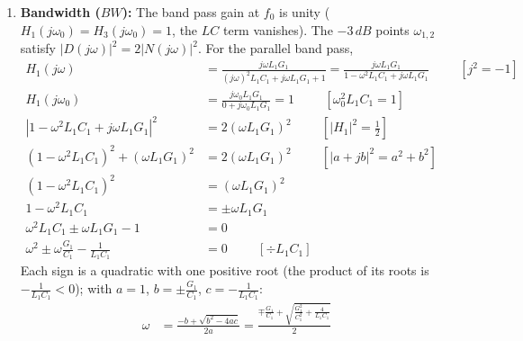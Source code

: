 \begin{enumerate}
\begin{enumerate}
        Zero DC gain for \(H_3(s)\). \\
        For band stop \(H_4(s)\):
        \begin{align*}
          H_4(0) &= \frac{G_1(1 + 0^2 \cdot L_1 C_1)}{0 \cdot C_1 + G_1(1 + 0^2 \cdot L_1 C_1)} = \frac{G_1(1 + 0)}{0 + G_1(1 + 0)} = \frac{G_1}{G_1} = 1
        \end{align*}
        Unity DC gain for \(H_4(s)\).
    \end{enumerate}
  \item \textbf{Bandwidth (\(BW\)):}
    The band pass gain at \(f_0\) is unity (\(H_1(j\omega_0) = H_3(j\omega_0) = 1\),
    the \(LC\) term vanishes). The \(-3\,dB\) points \(\omega_{1,2}\) satisfy
    \(|D(j\omega)|^2 = 2|N(j\omega)|^2\). For the parallel band pass,
    \begin{align*}
      H_1(j\omega) &= \frac{j\omega L_1 G_1}{(j\omega)^2 L_1 C_1 + j\omega L_1 G_1 + 1} = \frac{j\omega L_1 G_1}{1 - \omega^2 L_1 C_1 + j\omega L_1 G_1} \hspace{1cm} [j^2 = -1] \\
      H_1(j\omega_0) &= \frac{j\omega_0 L_1 G_1}{0 + j\omega_0 L_1 G_1} = 1 \hspace{1cm} [\omega_0^2 L_1 C_1 = 1] \\
      \left|1 - \omega^2 L_1 C_1 + j\omega L_1 G_1\right|^2 &= 2 (\omega L_1 G_1)^2 \hspace{1cm} [|H_1|^2 = \tfrac{1}{2}] \\
      (1 - \omega^2 L_1 C_1)^2 + (\omega L_1 G_1)^2 &= 2 (\omega L_1 G_1)^2 \hspace{1cm} [|a + jb|^2 = a^2 + b^2] \\
      (1 - \omega^2 L_1 C_1)^2 &= (\omega L_1 G_1)^2 \\
      1 - \omega^2 L_1 C_1 &= \pm \omega L_1 G_1 \\
      \omega^2 L_1 C_1 \pm \omega L_1 G_1 - 1 &= 0 \\
      \omega^2 \pm \omega \frac{G_1}{C_1} - \frac{1}{L_1 C_1} &= 0 \hspace{1cm} [\div L_1 C_1]
    \end{align*}
    Each sign is a quadratic with one positive root (the product of its roots
    is \(-\frac{1}{L_1 C_1} < 0\)); with \(a = 1\), \(b = \pm\frac{G_1}{C_1}\),
    \(c = -\frac{1}{L_1 C_1}\):
    \begin{align*}
      \omega &= \frac{-b + \sqrt{b^2 - 4ac}}{2a} = \frac{\mp \frac{G_1}{C_1} + \sqrt{\frac{G_1^2}{C_1^2} + \frac{4}{L_1 C_1}}}{2} \\

\end{align*}
\end{enumerate}
